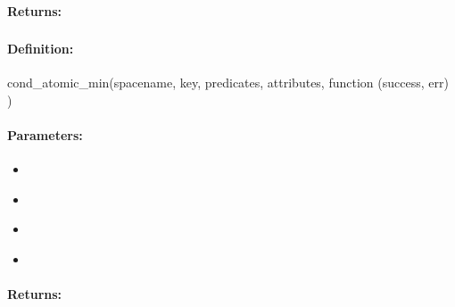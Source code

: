 \paragraph{Returns:}


\pagebreak
\subsubsection{}
\label{api:nodejs:cond_atomic_min}


\paragraph{Definition:}
\begin{javascriptcode}
cond_atomic_min(spacename, key, predicates, attributes, function (success, err) {})
\end{javascriptcode}
\paragraph{Parameters:}
\begin{itemize}[noitemsep]
\item {}\\

\item {}\\

\item {}\\

\item {}\\

\end{itemize}

\paragraph{Returns:}


\pagebreak
\subsubsection{}
\label{api:nodejs:group_atomic_min}


